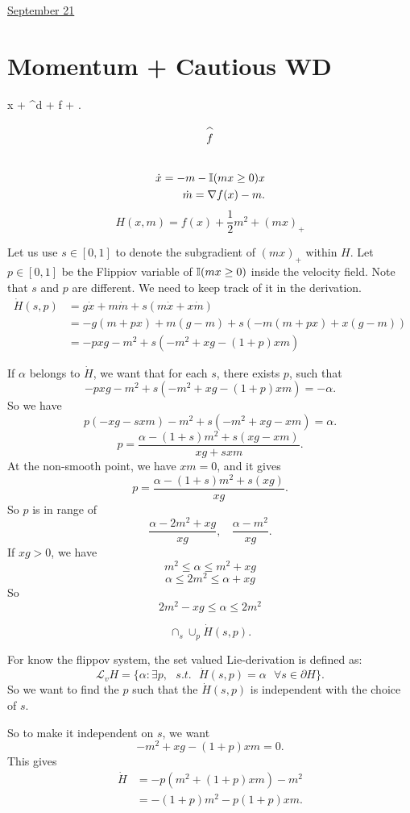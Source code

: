 \documentclass[11pt,letterpaper]{article}
\begin{document}
\href{run:2025-09-21-momentum_cwd.tex}{\Huge September 21} 

\section{Momentum + Cautious WD}

\bb
\dot x + \RR^d + \dd f + \E[x]. 
\ee 
$$
\reallywidehat f
$$

\begin{align}
    \dot x = - m - \mathbb{I}(mx\geq 0) x \\ 
    \dot m = \nabla f(x) - m. 
\end{align}
$$
H(x, m) = f(x) + \frac{1}{2} m^2 + (mx)_+
$$

Let us use $s \in[0,1]$ to denote the subgradient of $(mx)_+$ within $H$. Let $p \in[0,1]$ be the Flippiov variable of $\mathbb{I}(mx \geq 0)$ inside the velocity field. Note that $s$ and $p$ are different. We need to keep track of it in the derivation. 
\begin{align*}
\dot H(s,p) &  =  g \dot x + m \dot m + s (m \dot x + x \dot m) \\ 
& = -g (m + p x) + m(g - m) + s (-m (m + p x) + x (g - m) )\\
& = - p x g - m^2 + s (- m^2 + xg - (1+p)xm)
\end{align*}

If $\alpha$ belongs to $\dot H$, we want that for each $s$, there exists $p$, such that 
$$
- p x g - m^2 + s (- m^2 + xg - (1+p)xm) = -\alpha.
$$
So we have 
$$
p (-xg - s x m ) - m^2 + s (-m^2 + xg - xm) = \alpha. 
$$
$$
p = \frac{\alpha -(1+s) m^2 + s (xg - xm)}{xg +  s xm}. 
$$
At the non-smooth point, we have $xm =0$, and it gives 
$$
p = \frac{\alpha -(1+s) m^2 + s (xg)}{xg}.  
$$
So $p$ is in range of 
$$
\frac{\alpha - 2m^2 + xg}{xg}, ~~~~ 
\frac{\alpha - m^2 }{xg}. 
$$
If $xg >0$, we have 
$$
m^2 \leq \alpha \leq m^2 + xg
$$
$$
\alpha \leq 2m^2 \leq \alpha + xg 
$$
So 
$$
2m^2  - xg \leq \alpha \leq 2 m^2
$$

$$\cap_{s} \cup_{p} \dot H(s, p).$$


For know the flippov system, the set valued Lie-derivation is defined as:
$$
\mathcal L_v H  =   
\{\alpha \colon \exists p, ~~~ s.t. ~~~ \dot H(s,p) = \alpha ~~~\forall s \in \partial H \}.
$$
So we want to find the $p$ such that the $\dot H(s,p)$ is independent with the choice of $s$. 

So to make it independent on $s$, we want 
$$
-m^2 + xg -(1+p)xm  = 0.
$$
This gives
\begin{align*}
\dot H 
& = -p(m^2 + (1+p) xm)- m^2 \\
& = -(1+p)m^2 - p(1+p) xm. 
\end{align*}
\end{document}
